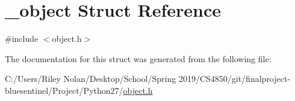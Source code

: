 \hypertarget{struct__object}{}\section{\+\_\+object Struct Reference}
\label{struct__object}


{\ttfamily \#include $<$object.\+h$>$}



The documentation for this struct was generated from the following file\+:\begin{DoxyCompactItemize}
\item 
C\+:/\+Users/\+Riley Nolan/\+Desktop/\+School/\+Spring 2019/\+C\+S4850/git/finalproject-\/bluesentinel/\+Project/\+Python27/\mbox{\hyperlink{_python27_2object_8h}{object.\+h}}\end{DoxyCompactItemize}
